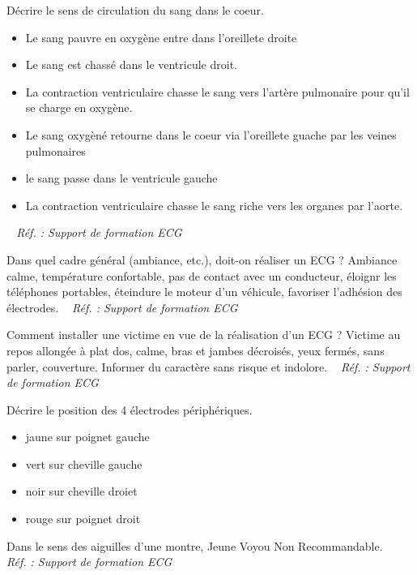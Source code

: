 \documentclass[grid,avery5371,landscape]{flashcards}
\makeatletter
\newcounter{nocarte}
\newcommand{\categ}[1]{%
  \def\@categ{#1}%
  \setcounter{nocarte}{0}%
}
\newcommand{\source}[1]{%
  \medskip
  \itshape%
   ~ \hfill Réf. : #1}
\makeatother
\begin{document}
\color[HTML]{FF6D01}
\categ{PSE+}
\begin{flashcard}[bilan]{
 Décrire le sens de circulation du sang dans le coeur.   }
  \begin{itemize}
\item Le sang pauvre en oxygène entre dans l'oreillete droite
\item Le sang est chassé dans le ventricule droit.
\item La contraction ventriculaire chasse le sang vers l'artère pulmonaire pour qu'il se charge en oxygène.
\item Le sang oxygèné retourne dans le coeur via l'oreillete guache par les veines pulmonaires
\item le sang passe dans le ventricule gauche
\item La contraction ventriculaire chasse le sang riche vers les organes par l'aorte.
\end{itemize}
  \source{Support de formation ECG}
\end{flashcard}


\color[HTML]{FF6D01}
\categ{PSE+}
\begin{flashcard}[geste]{
 Dans quel cadre général (ambiance, etc.), doit-on réaliser un ECG ?   }
  Ambiance calme, température confortable, pas de contact avec un conducteur, éloignr les téléphones portables, éteindure le moteur d'un véhicule, favoriser l'adhésion des électrodes.
  \source{Support de formation ECG}
\end{flashcard}


\color[HTML]{FF6D01}
\categ{PSE+}
\begin{flashcard}[geste]{
 Comment installer une victime en vue de la réalisation d'un ECG ?   }
  Victime au repos allongée à plat dos, calme, bras et jambes décroisés, yeux fermés, sans parler, couverture. Informer du caractère sans risque et indolore.
  \source{Support de formation ECG}
\end{flashcard}


\color[HTML]{FF6D01}
\categ{PSE+}
\begin{flashcard}[geste]{
 Décrire le position des 4 électrodes périphériques.   }
  \begin{itemize}
 \item jaune sur poignet gauche
 \item vert sur cheville gauche
 \item noir sur cheville droiet 
\item rouge sur poignet droit
 \end{itemize}
Dans le sens des aiguilles d'une montre, Jeune Voyou Non Recommandable.
  \source{Support de formation ECG}
\end{flashcard}
\end{document}

